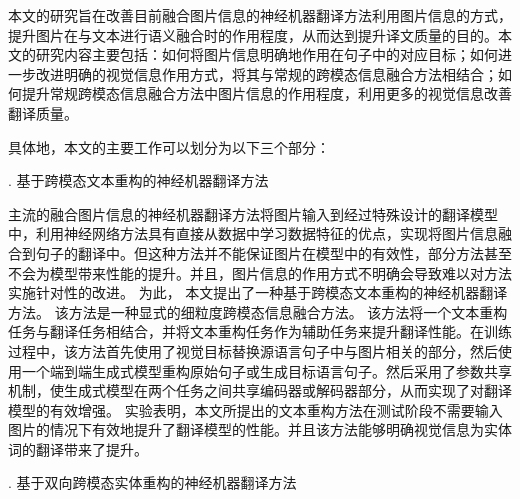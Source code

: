 本文的研究旨在改善目前融合图片信息的神经机器翻译方法利用图片信息的方式，提升图片在与文本进行语义融合时的作用程度，从而达到提升译文质量的目的。本文的研究内容主要包括：如何将图片信息明确地作用在句子中的对应目标；如何进一步改进明确的视觉信息作用方式，将其与常规的跨模态信息融合方法相结合；如何提升常规跨模态信息融合方法中图片信息的作用程度，利用更多的视觉信息改善翻译质量。

具体地，本文的主要工作可以划分为以下三个部分：

{. 基于跨模态文本重构的神经机器翻译方法}

主流的融合图片信息的神经机器翻译方法将图片输入到经过特殊设计的翻译模型中，利用神经网络方法具有直接从数据中学习数据特征的优点，实现将图片信息融合到句子的翻译中。但这种方法并不能保证图片在模型中的有效性，部分方法甚至不会为模型带来性能的提升。并且，图片信息的作用方式不明确会导致难以对方法实施针对性的改进。
为此，%
本文提出了一种基于跨模态文本重构的神经机器翻译方法。
该方法是一种显式的细粒度跨模态信息融合方法。%
该方法将一个文本重构任务与翻译任务相结合，并将文本重构任务作为辅助任务来提升翻译性能。在训练过程中，该方法首先使用了视觉目标替换源语言句子中与图片相关的部分，然后使用一个端到端生成式模型重构原始句子或生成目标语言句子。然后采用了参数共享机制，使生成式模型在两个任务之间共享编码器或解码器部分，从而实现了对翻译模型的有效增强。
实验表明，本文所提出的文本重构方法在测试阶段不需要输入图片的情况下有效地提升了翻译模型的性能。并且该方法能够明确视觉信息为实体词的翻译带来了提升。

{. 基于双向跨模态实体重构的神经机器翻译方法}

